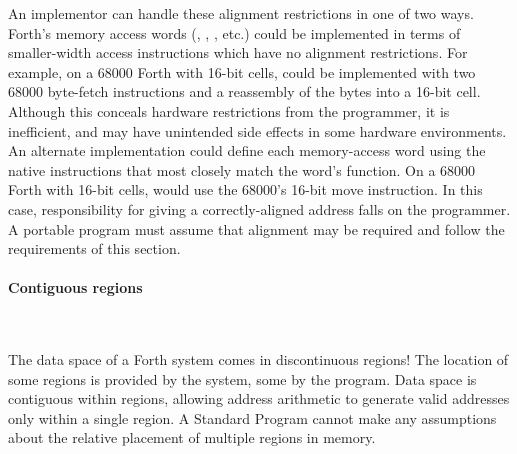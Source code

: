 An implementor  can handle these alignment restrictions
in one of two ways. Forth's memory access words (, \word{!},
\word{+!}, etc.) could be implemented in terms of smaller-width access
instructions which have no alignment restrictions. For example, on a
68000 Forth with 16-bit cells,  could be implemented with two
68000 byte-fetch instructions and a reassembly of the bytes into a
16-bit cell. Although this conceals hardware restrictions from the
programmer, it is inefficient, and may have unintended side effects
in some hardware environments.  An alternate implementation 
could define each memory-access word using the native instructions
that most closely match the word's function. On a 68000 Forth with
16-bit cells,  would use the 68000's 16-bit move instruction.
In this case, responsibility for giving  a correctly-aligned
address falls on the programmer.  A portable  program must
assume that alignment may be required and follow the requirements of
this section.

\paragraph{Contiguous regions} ~ %

The data space of a Forth system comes in discontinuous regions! The
location of some regions is provided by the system, some by the
program. Data space is contiguous within regions, allowing address
arithmetic to generate valid addresses only within a single region.
A Standard Program cannot make any assumptions about the relative
placement of multiple regions in memory.

